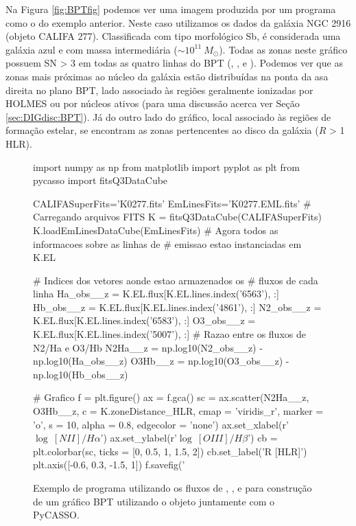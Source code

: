 Na Figura \ref{fig:BPTfig} podemos ver uma imagem produzida por um programa como o do exemplo anterior. Neste caso utilizamos os dados da galáxia NGC 2916 (objeto CALIFA 277). Classificada com tipo morfológico Sb, é considerada uma galáxia azul e com massa intermediária ($\sim 10^{11}\ M_\odot$). Todas as zonas neste gráfico possuem SN > 3 em todas as quatro linhas do BPT (\Hb, \oiii, \Ha e \nii). Podemos ver que as zonas mais próximas ao núcleo da galáxia estão distribuídas na ponta da asa direita no plano BPT, lado associado às regiões geralmente ionizadas por HOLMES ou por núcleos ativos (para uma discussão acerca ver Seção \ref{sec:DIGdisc:BPT}). Já do outro lado do gráfico, local associado às regiões de formação estelar, se encontram as zonas pertencentes ao disco da galáxia ($R$ > 1 HLR).

\begin{figure}
	\begin{python}
import numpy as np
from matplotlib import pyplot as plt
from pycasso import fitsQ3DataCube

CALIFASuperFits='K0277.fits'
EmLinesFits='K0277.EML.fits'
# Carregando arquivos FITS
K = fitsQ3DataCube(CALIFASuperFits)
K.loadEmLinesDataCube(EmLinesFits)
# Agora todos as informacoes sobre as linhas de
# emissao estao instanciadas em K.EL

# Indices dos vetores aonde estao armazenados os
# fluxos de cada linha
Ha_obs__z = K.EL.flux[K.EL.lines.index('6563'), :]
Hb_obs__z = K.EL.flux[K.EL.lines.index('4861'), :]
N2_obs__z = K.EL.flux[K.EL.lines.index('6583'), :]
O3_obs__z = K.EL.flux[K.EL.lines.index('5007'), :]
# Razao entre os fluxos de N2/Ha e O3/Hb
N2Ha__z = np.log10(N2_obs__z) - np.log10(Ha_obs__z)
O3Hb__z = np.log10(O3_obs__z) - np.log10(Hb_obs__z)

# Grafico
f = plt.figure()
ax = f.gca()
sc = ax.scatter(N2Ha__z, O3Hb__z, c = K.zoneDistance_HLR,
           		cmap = 'viridis_r', marker = 'o', s = 10,
           		alpha = 0.8, edgecolor = 'none')
ax.set_xlabel(r'$\log\ [NII]/H\alpha$')
ax.set_ylabel(r'$\log\ [OIII]/H\beta$')
cb = plt.colorbar(sc, ticks = [0, 0.5, 1, 1.5, 2])
cb.set_label('R [HLR]')
plt.axis([-0.6, 0.3, -1.5, 1])
f.savefig('%
	\end{python}
	\caption[Exemplo de programa utilizando o EmLinesDataCube]
	{Exemplo de programa utilizando os fluxos de \Ha, \Hb, \OIII e \NII
para construção de um gráfico BPT utilizando o objeto \emldc juntamente com o PyCASSO.}
	\label{fig:BPTprog}
\end{figure}

